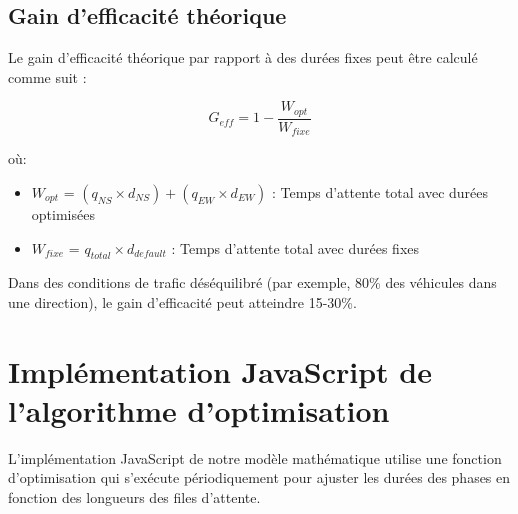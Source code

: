 \subsection{Gain d'efficacité théorique}
\label{subsec:efficacité}

Le gain d'efficacité théorique par rapport à des durées fixes peut être calculé comme suit :

\begin{equation}
G_{eff} = 1 - \frac{W_{opt}}{W_{fixe}}
\end{equation}

où:
\begin{itemize}
    \item $W_{opt}$ = $(q_{NS} \times d_{NS}) + (q_{EW} \times d_{EW})$ : Temps d'attente total avec durées optimisées
    \item $W_{fixe}$ = $q_{total} \times d_{default}$ : Temps d'attente total avec durées fixes
\end{itemize}

Dans des conditions de trafic déséquilibré (par exemple, 80\% des véhicules dans une direction), le gain d'efficacité peut atteindre 15-30\%.

\section{Implémentation JavaScript de l'algorithme d'optimisation}
\label{sec:implementation}

L'implémentation JavaScript de notre modèle mathématique utilise une fonction d'optimisation qui s'exécute périodiquement pour ajuster les durées des phases en fonction des longueurs des files d'attente.

